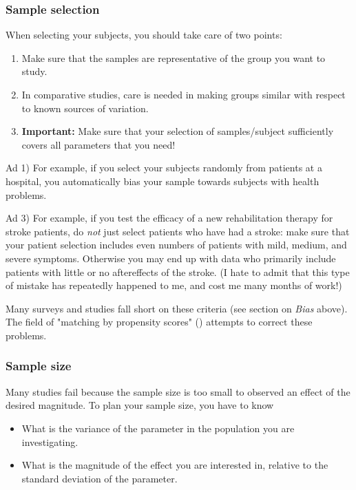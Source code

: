 \subsubsection{Sample selection} 
When selecting your subjects, you should take care of two points:

\begin{enumerate}
  \item Make sure that the samples are representative of the group you want to study.
  \item In comparative studies, care is needed in making groups similar with respect to known sources of variation.
  \item \textbf{Important:} Make sure that your selection of samples/subject sufficiently covers all parameters that you need!
\end{enumerate}

Ad 1) For example, if you select your subjects randomly from patients at a hospital, you automatically bias your sample towards subjects with health problems.

Ad 3) For example, if you test the efficacy of a new rehabilitation therapy for stroke patients, do \emph{not} just select patients who have had a stroke: make sure that your patient selection includes even numbers of patients with mild, medium, and severe symptoms. Otherwise you may end up with data who primarily include patients with little or no aftereffects of the stroke. (I hate to admit that this type of mistake has repeatedly happened to me, and cost me many months of work!)

Many surveys and studies fall short on these criteria (see section on \emph{Bias} above). The field of "matching by propensity scores" (\cite{Rosenbaum1983}) attempts to correct these problems.

\subsubsection{Sample size}
Many studies fail because the sample size is too small to observed an effect of the desired magnitude. To plan your sample size, you have to know
\begin{itemize}
  \item What is the variance of the parameter in the population you are investigating.
  \item What is the magnitude of the effect you are interested in, relative to the standard deviation of the parameter.
\end{itemize}

